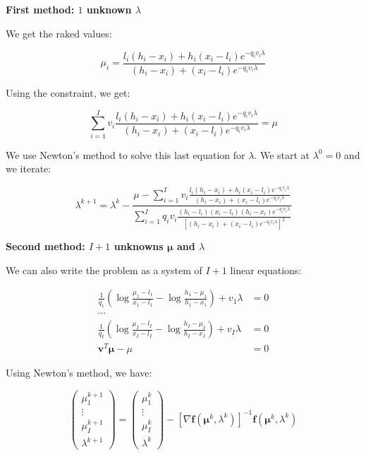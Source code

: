 \documentclass{tex/note}
\begin{document}
\textbf{First method: $1$ unknown $\lambda$}

We get the raked values:

\begin{equation*}
\mu_i = \frac{l_i \left( h_i - x_i \right) + h_i \left( x_i - l_i \right) e^{ - q_i v_i \lambda}}{ \left( h_i - x_i \right) + \left( x_i - l_i \right) e^{ - q_i v_i \lambda}} 
\end{equation*}

Using the constraint, we get:

\begin{equation*}
\sum_{i = 1}^I v_i \frac{l_i \left( h_i - x_i \right) + h_i \left( x_i - l_i \right) e^{ - q_i v_i \lambda}}{ \left( h_i - x_i \right) + \left( x_i - l_i \right) e^{ - q_i v_i \lambda}} = \mu
\end{equation*}

We use Newton's method to solve this last equation for $\lambda$. We start at $\lambda^0 = 0$ and we iterate:

\begin{equation*}
\lambda^{k + 1} = \lambda^k - \frac{\mu - \sum_{i = 1}^I v_i \frac{l_i \left( h_i - x_i \right) + h_i \left( x_i - l_i \right) e^{ - q_i v_i \lambda}}{ \left( h_i - x_i \right) + \left( x_i - l_i \right) e^{ - q_i v_i \lambda}}}{\sum_{i = 1}^I q_i v_i \frac{\left( h_i - l_i \right) \left( x_i - l_i \right) \left( h_i - x_i \right) e^{- q_i v_i \lambda}}{\left[ \left( h_i - x_i \right) + \left( x_i - l_i \right) e^{- q_i v_i \lambda} \right]^2}}
\end{equation*}

\textbf{Second method: $I + 1$ unknowns $\bm{\mu}$ and $\lambda$}

We can also write the problem as a system of $I + 1$ linear equations:

\begin{align*}
\frac{1}{q_1} \left( \log \frac{\mu_1 - l_1}{x_1 - l_1} - \log \frac{h_1 - \mu_1}{h_1 - x_1} \right) + v_1 \lambda &= 0 \\
\cdots & \\
\frac{1}{q_I} \left( \log \frac{\mu_I - l_I}{x_I - l_I} - \log \frac{h_I - \mu_I}{h_I - x_I} \right) + v_I \lambda &= 0 \\
\bm{v}^T \bm{\mu} - \mu &= 0
\end{align*}

Using Newton's method, we have:

\begin{equation*}
\begin{pmatrix} \mu_1^{k + 1} \\ \vdots \\ \mu_I^{k + 1} \\ \lambda^{k + 1} \end{pmatrix} = \begin{pmatrix} \mu_1^k \\ \vdots \\ \mu_I^k \\ \lambda^k \end{pmatrix} - \left[ \nabla \bm{f} \left( \bm{\mu}^k , \lambda^k \right) \right] ^{-1} \bm{f} \left( \bm{\mu}^k , \lambda^k \right)
\end{equation*}
\end{document}
